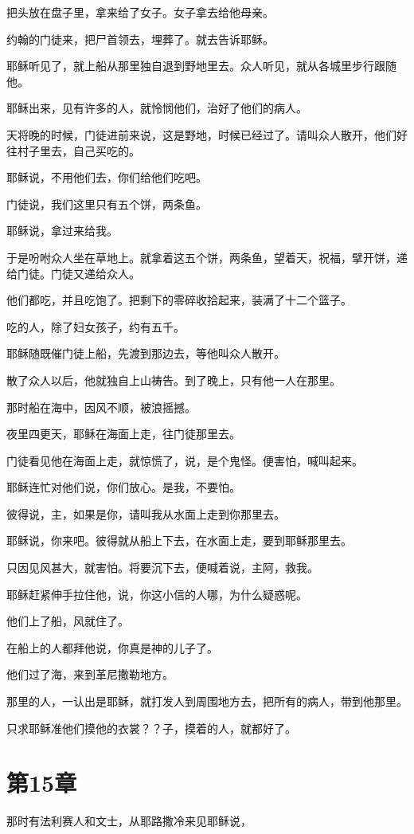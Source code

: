 \documentclass[12pt,oneside]{book}
\begin{document}
把头放在盘子里，拿来给了女子。女子拿去给他母亲。

约翰的门徒来，把尸首领去，埋葬了。就去告诉耶稣。

耶稣听见了，就上船从那里独自退到野地里去。众人听见，就从各城里步行跟随他。

耶稣出来，见有许多的人，就怜悯他们，治好了他们的病人。

天将晚的时候，门徒进前来说，这是野地，时候已经过了。请叫众人散开，他们好往村子里去，自己买吃的。

耶稣说，不用他们去，你们给他们吃吧。

门徒说，我们这里只有五个饼，两条鱼。

耶稣说，拿过来给我。

于是吩咐众人坐在草地上。就拿着这五个饼，两条鱼，望着天，祝福，擘开饼，递给门徒。门徒又递给众人。

他们都吃，并且吃饱了。把剩下的零碎收拾起来，装满了十二个篮子。

吃的人，除了妇女孩子，约有五千。

耶稣随既催门徒上船，先渡到那边去，等他叫众人散开。

散了众人以后，他就独自上山祷告。到了晚上，只有他一人在那里。

那时船在海中，因风不顺，被浪摇撼。

夜里四更天，耶稣在海面上走，往门徒那里去。

门徒看见他在海面上走，就惊慌了，说，是个鬼怪。便害怕，喊叫起来。

耶稣连忙对他们说，你们放心。是我，不要怕。

彼得说，主，如果是你，请叫我从水面上走到你那里去。

耶稣说，你来吧。彼得就从船上下去，在水面上走，要到耶稣那里去。

只因见风甚大，就害怕。将要沉下去，便喊着说，主阿，救我。

耶稣赶紧伸手拉住他，说，你这小信的人哪，为什么疑惑呢。

他们上了船，风就住了。

在船上的人都拜他说，你真是神的儿子了。

他们过了海，来到革尼撒勒地方。

那里的人，一认出是耶稣，就打发人到周围地方去，把所有的病人，带到他那里。

只求耶稣准他们摸他的衣裳？？子，摸着的人，就都好了。

\chapter{第15章}
那时有法利赛人和文士，从耶路撒冷来见耶稣说，
\end{document}
